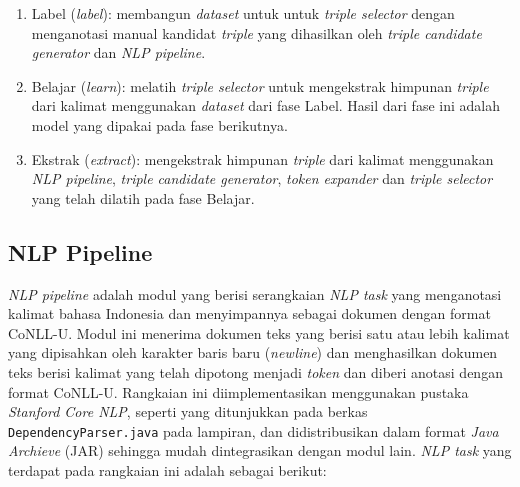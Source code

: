 \begin{enumerate}
	\item Label (\textit{label}): membangun \textit{dataset} untuk untuk \textit{triple selector} dengan menganotasi manual kandidat \textit{triple} yang dihasilkan oleh \textit{triple candidate generator} dan \textit{NLP pipeline}.  
	\item Belajar (\textit{learn}): melatih \textit{triple selector} untuk mengekstrak himpunan \textit{triple} dari kalimat menggunakan \textit{dataset} dari fase Label. Hasil dari fase ini adalah model yang dipakai pada fase berikutnya.
	\item Ekstrak (\textit{extract}): mengekstrak himpunan \textit{triple} dari kalimat menggunakan \textit{NLP pipeline}, \textit{triple candidate generator}, \textit{token expander} dan \textit{triple selector} yang telah dilatih pada fase Belajar.
\end{enumerate}


\subsection{NLP Pipeline}

\textit{NLP pipeline} adalah modul yang berisi serangkaian \textit{NLP task} yang menganotasi kalimat bahasa Indonesia dan menyimpannya sebagai dokumen dengan format CoNLL-U. Modul ini menerima dokumen teks yang berisi satu atau lebih kalimat yang dipisahkan oleh karakter baris baru (\textit{newline}) dan menghasilkan dokumen teks berisi kalimat yang telah dipotong menjadi \textit{token} dan diberi anotasi dengan format CoNLL-U. Rangkaian ini diimplementasikan menggunakan pustaka \textit{Stanford Core NLP}, seperti yang ditunjukkan pada berkas \verb|DependencyParser.java| pada lampiran, dan didistribusikan dalam format \textit{Java Archieve} (JAR) sehingga mudah dintegrasikan dengan modul lain. \textit{NLP task} yang terdapat pada rangkaian ini adalah sebagai berikut:

